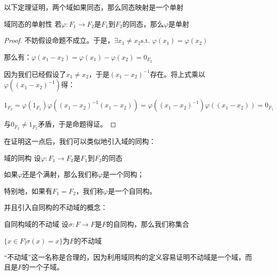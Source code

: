\documentclass[12pt, a4paper, oneside, UTF8]{ctexbook}
\begin{document}
		以下定理证明，两个域如果同态，那么同态映射是一个单射
		\begin{them}{域同态的单射性}{}
			若$\varphi : F_1 \rightarrow F_2$是$F_1$到$F_2$的同态，那么$\varphi$是单射
		\end{them}
		\begin{proof}
			不妨假设命题不成立。于是，$\exists x_1 \neq x_2 \text{s.t. }\varphi(x_1)=\varphi(x_2)$
			
			那么有：$\varphi (x_1-x_2)=\varphi (x_1)-\varphi (x_2) = 0_{F_2}$
			
			因为我们已经假设了$x_1 \neq x_2$，于是$(x_1-x_2)^{-1}$存在。将上式乘以$\varphi\left((x_1-x_2)^{-1}\right)$得：
			
			$1_{F_2} = \varphi (1_{F_1}) \varphi\left((x_1-x_2)^{-1} (x_1-x_2)\right) = \varphi\left((x_1-x_2)^{-1}\right)\varphi\left((x_1-x_2)\right)=0_{F_1}$
			
			与$0_{F_2} \neq 1_{F_2}$矛盾，于是命题得证。
		\end{proof}
		在证明这一点后，我们可以类似地引入域的同构：
		\begin{defn}{域的同构}{}
			设$\varphi : F_1 \rightarrow F_2$是$F_1$到$F_2$的同态
			
			如果$\varphi$还是个满射，那么我们称$\varphi$是一个同构；
			
			特别地，如果有$F_1=F_2$，我们称$\varphi$是一个自同构。
		\end{defn}
		并且引入自同构的不动域的概念：
		\begin{defn}{自同构域的不动域}{}
			设$\sigma : F \rightarrow F$是$F$的自同构，那么我们称集合
			
			$\{x \in F | \sigma(x) = x\}$为$F$的不动域
		\end{defn}
		“不动域”这一名称是合理的，因为利用域同构的定义容易证明不动域是一个域，而且是$F$的一个子域。
\end{document}
